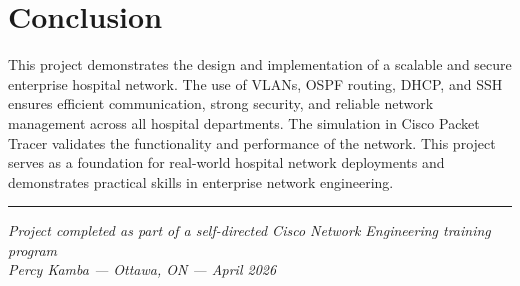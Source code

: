 \documentclass[12pt, a4paper]{article}
\begin{document}
\section{Conclusion}

This project demonstrates the design and implementation of a scalable and secure 
enterprise hospital network. The use of VLANs, OSPF routing, DHCP, and SSH ensures 
efficient communication, strong security, and reliable network management across all 
hospital departments. The simulation in Cisco Packet Tracer validates the functionality 
and performance of the network. This project serves as a foundation for real-world 
hospital network deployments and demonstrates practical skills in enterprise 
network engineering.

\vspace{2cm}
\rule{0.5\textwidth}{0.5pt}

\textit{Project completed as part of a self-directed Cisco Network Engineering 
training program}\\
\textit{Percy Kamba --- Ottawa, ON --- April 2026}
\end{document}
